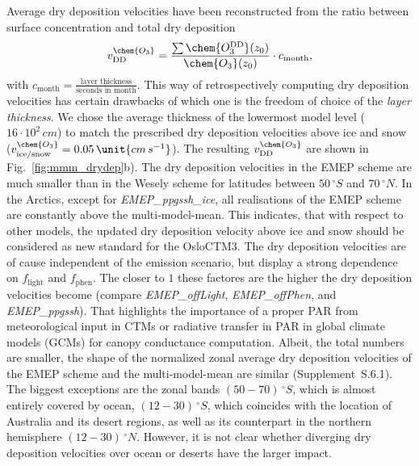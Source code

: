 \documentclass[gmd, manuscript]{copernicus}
\begin{document}
Average dry deposition velocities have been reconstructed from the ratio between surface concentration and total dry deposition
\begin{equation}
  v^\chem{O_3}_\text{DD} = \frac{\sum \chem{O_3^\text{DD}}(z_0)}{\chem{O_3}(z_0)}\cdot c_\text{month},
\end{equation}
with $c_\text{month} = \frac{\text{layer thickness}}{\text{seconds in month}}$. This way of retrospectively computing dry deposition velocities has certain drawbacks of which one is the freedom of choice of the \emph{layer thickness}. We chose the average thickness of the lowermost model level ($16\cdot10^{2}\,\unit{cm}$) to match the prescribed dry deposition velocities above ice and snow ($v_\text{ice/snow}^\chem{O_3} = 0.05\,\unit{cm\,s^{-1}}$). The resulting $v^\chem{O_3}_\text{DD}$ are shown in Fig.~\ref{fig:mmm_drydep}b). The dry deposition velocities in the EMEP scheme are much smaller than in the Wesely scheme for latitudes between $50\,\unit{^\circ S}$ and $70\,\unit{^\circ N}$. In the Arctics, except for \emph{EMEP\_ppgssh\_ice}, all realisations of the EMEP scheme are constantly above the multi-model-mean. This indicates, that with respect to other models, the updated dry deposition velocity above ice and snow should be considered as new standard for the OsloCTM3. The dry deposition velocities are of cause independent of the emission scenario, but display a strong dependence on $f_\text{light}$ and $f_\text{phen}$. The closer to $1$ these factores are the higher the dry deposition velocities become (compare \emph{EMEP\_offLight}, \emph{EMEP\_offPhen}, and \emph{EMEP\_ppgssh}). That highlights the importance of a proper PAR from meteorological input in CTMs or radiative transfer in PAR in global climate models (GCMs) for canopy conductance computation. Albeit, the total numbers are smaller, the shape of the normalized zonal average dry deposition velocities of the EMEP scheme and the multi-model-mean are similar (Supplement~S.6.1). The biggest exceptions are the zonal bands $(50-70)\,\unit{^\circ S}$, which is almost entirely covered by ocean, $(12-30)\,\unit{^\circ S}$, which coincides with the location of Australia and its desert regions, as well as its counterpart in the northern hemisphere $(12-30)\,\unit{^\circ N}$. However, it is not clear whether diverging dry deposition velocities over ocean or deserts have the larger impact.
\end{document}
